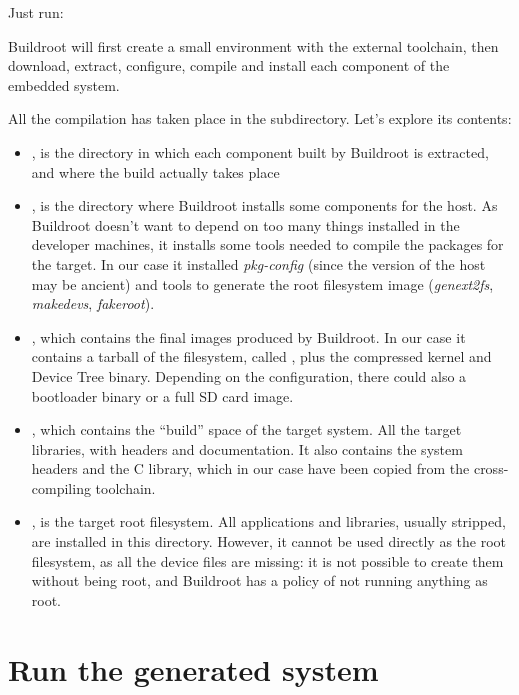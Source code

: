 Just run:


Buildroot will first create a small environment with the external
toolchain, then download, extract, configure, compile and install each
component of the embedded system.

All the compilation has taken place in the  subdirectory. Let's
explore its contents:

\begin{itemize}

\item {}, is the directory in which each component built by
  Buildroot is extracted, and where the build actually takes place

\item {}, is the directory where Buildroot installs some
  components for the host. As Buildroot doesn't want to depend on too
  many things installed in the developer machines, it installs some
  tools needed to compile the packages for the target. In our case it
  installed {\em pkg-config} (since the version of the host may be ancient)
  and tools to generate the root filesystem image ({\em genext2fs},
  {\em makedevs}, {\em fakeroot}).

\item {}, which contains the final images produced by
  Buildroot. In our case it contains a tarball of the filesystem, called
  , plus the compressed kernel and Device Tree binary.
  Depending on the configuration, there could also a bootloader binary
  or a full SD card image.

\item {}, which contains the “build” space of the target
  system. All the target libraries, with headers and documentation. It
  also contains the system headers and the C library, which in our
  case have been copied from the cross-compiling toolchain.

\item {}, is the target root filesystem. All applications
  and libraries, usually stripped, are installed in this
  directory. However, it cannot be used directly as the root
  filesystem, as all the device files are missing: it is not possible
  to create them without being root, and Buildroot has a policy of not
  running anything as root.

\end{itemize}

\section{Run the generated system}

